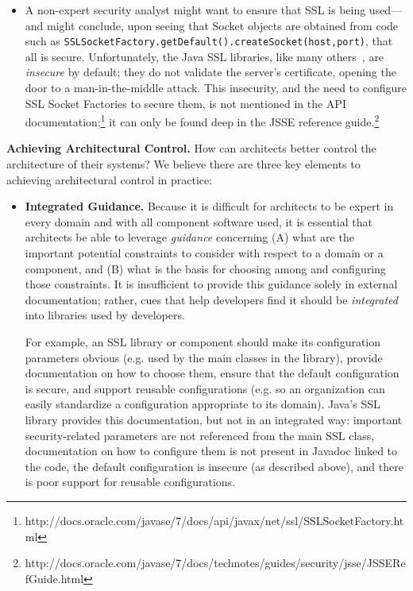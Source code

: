 \documentclass[runningheads]{llncs}
\newcommand{\minisec}[1]{\vspace{2ex}\noindent\textbf{#1}}
\begin{document}
\begin{sloppypar}
\begin{itemize}
\item A non-expert security analyst might want to ensure that SSL is being used---and might conclude, upon seeing that Socket objects are obtained from code such as \texttt{SSLSocketFactory.getDefault().createSocket(host,port)}, that all is secure.  Unfortunately, the Java SSL libraries, like many others~\cite{GIJABS12}, are \emph{insecure} by default; they do not validate the server's certificate, opening the door to a man-in-the-middle attack.  This insecurity, and the need to configure SSL Socket Factories to secure them, is not mentioned in the API documentation;\footnote{http://docs.oracle.com/javase/7/docs/api/javax/net/ssl/SSLSocketFactory.html} it can only be found deep in the JSSE reference guide.\footnote{http://docs.oracle.com/javase/7/docs/technotes/guides/security/jsse/JSSERefGuide.html}
\end{itemize}


\minisec{Achieving Architectural Control.} How can architects better control the architecture of their systems?  We believe there are three key elements to achieving architectural control in practice:

\begin{itemize}

\item \textbf{Integrated Guidance.}  Because it is difficult for architects to be expert in every domain and with all component software used, it is essential that architects be able to leverage \textit{guidance} concerning (A) what are the important potential constraints to consider with respect to a domain or a component, and (B) what is the basis for choosing among and configuring those constraints.  It is insufficient to provide this guidance solely in external documentation; rather, cues that help developers find it should be \textit{integrated} into libraries used by developers.

\indent\hspace{2ex}
For example, an SSL library or component should make its configuration parameters obvious (e.g. used by the main classes in the library), provide documentation on how to choose them, ensure that the default configuration is secure, and support reusable configurations (e.g. so an organization can easily standardize a configuration appropriate to its domain).  Java's SSL library provides this documentation, but not in an integrated way: important security-related parameters are not referenced from the main SSL class, documentation on how to configure them is not present in Javadoc linked to the code, the default configuration is insecure (as described above), and there is poor support for reusable configurations.


\end{itemize}
\end{sloppypar}
\end{document}
